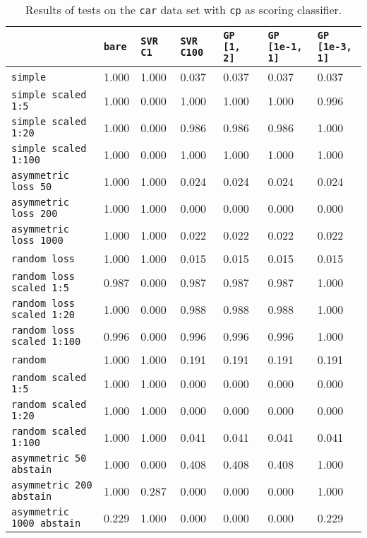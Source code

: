 \begin{table}[H]
{\scriptsize
\begin{tabu}{l|l|l|l|l|l|l}
&\texttt{bare} &\texttt{SVR C1} &\texttt{SVR C100} &\texttt{GP [1, 2]} &\texttt{GP [1e-1, 1]} &\texttt{GP [1e-3, 1]}  \\
\hline
\texttt{simple} &1.000 &1.000 &0.037 &0.037 &0.037 &0.037 \\
\texttt{simple scaled 1:5} &1.000 &0.000 &1.000 &1.000 &1.000 &0.996 \\
\texttt{simple scaled 1:20} &1.000 &0.000 &0.986 &0.986 &0.986 &1.000 \\
\texttt{simple scaled 1:100} &1.000 &0.000 &1.000 &1.000 &1.000 &1.000 \\
\texttt{asymmetric loss 50} &1.000 &1.000 &0.024 &0.024 &0.024 &0.024 \\
\texttt{asymmetric loss 200} &1.000 &1.000 &0.000 &0.000 &0.000 &0.000 \\
\texttt{asymmetric loss 1000} &1.000 &1.000 &0.022 &0.022 &0.022 &0.022 \\
\texttt{random loss} &1.000 &1.000 &0.015 &0.015 &0.015 &0.015 \\
\texttt{random loss scaled 1:5} &0.987 &0.000 &0.987 &0.987 &0.987 &1.000 \\
\texttt{random loss scaled 1:20} &1.000 &0.000 &0.988 &0.988 &0.988 &1.000 \\
\texttt{random loss scaled 1:100} &0.996 &0.000 &0.996 &0.996 &0.996 &1.000 \\
\texttt{random} &1.000 &1.000 &0.191 &0.191 &0.191 &0.191 \\
\texttt{random scaled 1:5} &1.000 &1.000 &0.000 &0.000 &0.000 &0.000 \\
\texttt{random scaled 1:20} &1.000 &1.000 &0.000 &0.000 &0.000 &0.000 \\
\texttt{random scaled 1:100} &1.000 &1.000 &0.041 &0.041 &0.041 &0.041 \\
\texttt{asymmetric 50 abstain} &1.000 &0.000 &0.408 &0.408 &0.408 &1.000 \\
\texttt{asymmetric 200 abstain} &1.000 &0.287 &0.000 &0.000 &0.000 &1.000 \\
\texttt{asymmetric 1000 abstain} &0.229 &1.000 &0.000 &0.000 &0.000 &0.229 \\
\end{tabu} }
\caption{Results of tests on the \texttt{car} data set
         with \texttt{cp} as scoring classifier.}
\end{table}

